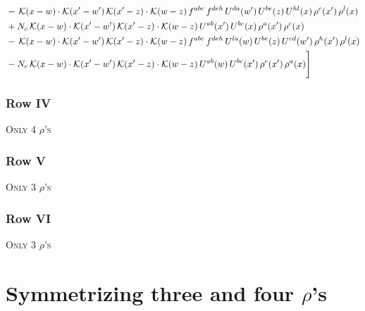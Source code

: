 \documentclass[9pt]{article}
\numberwithin{equation}{section}
\begin{document}
\begin{align}
&-\,\mathcal{K}(x-w)\cdot\mathcal{K}(x'-w')\,\mathcal{K}(x'-z)\cdot\mathcal{K}(w-z)\,f^{abc}\,f^{deh}\,U^{da}(w')\,U^{be}(z)\,U^{hl}(x)\,\rho^{c}(x')\,\rho^{l}(x)\notag\\
&+N_{c}\,\mathcal{K}(x-w)\cdot\mathcal{K}(x'-w')\,\mathcal{K}(x'-z)\cdot\mathcal{K}(w-z)\,U^{ab}(x')\,U^{bc}(x)\,\rho^{a}(x')\,\rho^{c}(x)\notag\\
&-\,\mathcal{K}(x-w)\cdot\mathcal{K}(x'-w')\,\mathcal{K}(x'-z)\cdot\mathcal{K}(w-z)\,f^{abc}\,f^{deh}\,U^{la}(w)\,U^{be}(z)\,U^{cd}(w')\,\rho^{h}(x')\,\rho^{l}(x)\notag\\
&-N_{c}\,\mathcal{K}(x-w)\cdot\mathcal{K}(x'-w')\,\mathcal{K}(x'-z)\cdot\mathcal{K}(w-z)\,U^{ab}(w)\,U^{bc}(x')\,\rho^{c}(x')\,\rho^{a}(x)\Bigg]
\end{align}
\subsubsection{Row IV}
\textsc{Only 4 $\rho$'s}
\subsubsection{Row V}
\textsc{Only 3 $\rho$'s}
\subsubsection{Row VI}
\textsc{Only 3 $\rho$'s}
\section{Symmetrizing three and four $\rho$'s}
\end{document}
